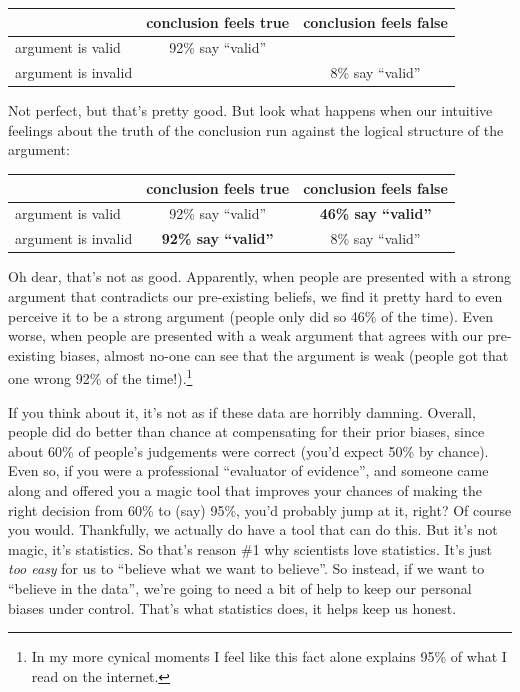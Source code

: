 \documentclass[
]{book}
\begin{document}
\begin{longtable}[]{@{}lcc@{}}
\toprule
& conclusion feels true & conclusion feels false \\
\midrule
\endhead
argument is valid & 92\% say ``valid'' & \\
argument is invalid & & 8\% say ``valid'' \\
\bottomrule
\end{longtable}

Not perfect, but that's pretty good. But look what happens when our intuitive feelings about the truth of the conclusion run against the logical structure of the argument:

\begin{longtable}[]{@{}lcc@{}}
\toprule
& conclusion feels true & conclusion feels false \\
\midrule
\endhead
argument is valid & 92\% say ``valid'' & \textbf{46\% say ``valid''} \\
argument is invalid & \textbf{92\% say ``valid''} & 8\% say ``valid'' \\
\bottomrule
\end{longtable}

Oh dear, that's not as good. Apparently, when people are presented with a strong argument that contradicts our pre-existing beliefs, we find it pretty hard to even perceive it to be a strong argument (people only did so 46\% of the time). Even worse, when people are presented with a weak argument that agrees with our pre-existing biases, almost no-one can see that the argument is weak (people got that one wrong 92\% of the time!).\footnote{In my more cynical moments I feel like this fact alone explains 95\% of what I read on the internet.}

If you think about it, it's not as if these data are horribly damning. Overall, people did do better than chance at compensating for their prior biases, since about 60\% of people's judgements were correct (you'd expect 50\% by chance). Even so, if you were a professional ``evaluator of evidence'', and someone came along and offered you a magic tool that improves your chances of making the right decision from 60\% to (say) 95\%, you'd probably jump at it, right? Of course you would. Thankfully, we actually do have a tool that can do this. But it's not magic, it's statistics. So that's reason \#1 why scientists love statistics. It's just \emph{too easy} for us to ``believe what we want to believe''. So instead, if we want to ``believe in the data'', we're going to need a bit of help to keep our personal biases under control. That's what statistics does, it helps keep us honest.
\end{document}
